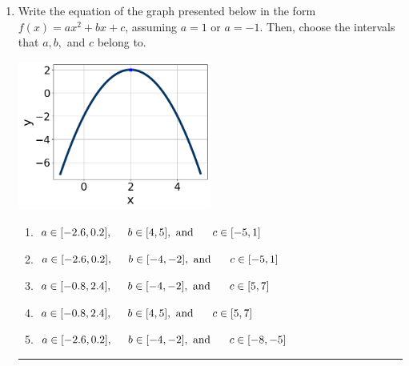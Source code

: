 \documentclass[14pt]{extbook}
\newcommand{\litem}[1]{\item#1\hspace*{-1cm}\rule{\textwidth}{0.4pt}}
\begin{document}
\begin{enumerate}
\litem{
Write the equation of the graph presented below in the form $f(x)=ax^2+bx+c$, assuming  $a=1$ or $a=-1$. Then, choose the intervals that $a, b,$ and $c$ belong to.
\begin{center}
    \includegraphics[width=0.5\textwidth]{../Figures/quadraticGraphToEquationA.png}
\end{center}
\begin{enumerate}[label=\Alph*.]
\item \( a \in [-2.6, 0.2], \hspace*{5mm} b \in [4, 5], \text{ and } \hspace*{5mm} c \in [-5, 1] \)
\item \( a \in [-2.6, 0.2], \hspace*{5mm} b \in [-4, -2], \text{ and } \hspace*{5mm} c \in [-5, 1] \)
\item \( a \in [-0.8, 2.4], \hspace*{5mm} b \in [-4, -2], \text{ and } \hspace*{5mm} c \in [5, 7] \)
\item \( a \in [-0.8, 2.4], \hspace*{5mm} b \in [4, 5], \text{ and } \hspace*{5mm} c \in [5, 7] \)
\item \( a \in [-2.6, 0.2], \hspace*{5mm} b \in [-4, -2], \text{ and } \hspace*{5mm} c \in [-8, -5] \)


\end{enumerate}}
\end{enumerate}
\end{document}
